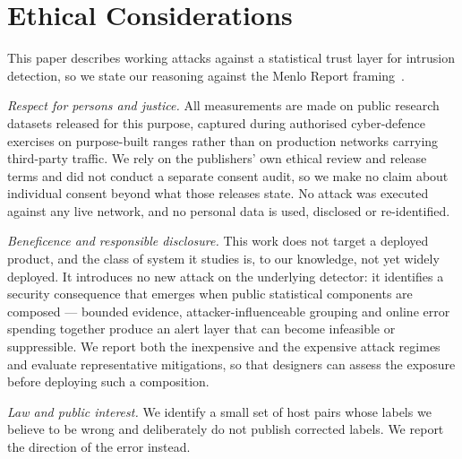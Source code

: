 \documentclass[conference]{IEEEtran}
\begin{document}
\section*{Ethical Considerations}

This paper describes working attacks against a statistical trust layer for intrusion detection, so we
state our reasoning against the Menlo Report framing~\cite{menlo2012}.

\emph{Respect for persons and justice.} All measurements are made on public research datasets released
for this purpose, captured during authorised cyber-defence exercises on purpose-built ranges rather than
on production networks carrying third-party traffic. We rely on the publishers' own ethical review and
release terms and did not conduct a separate consent audit, so we make no claim about individual consent
beyond what those releases state. No attack was executed against any live network, and no personal data
is used, disclosed or re-identified.

\emph{Beneficence and responsible disclosure.} This work does not target a deployed product, and the
class of system it studies is, to our knowledge, not yet widely deployed. It introduces no new attack on the underlying detector: it
identifies a security consequence that emerges when public statistical components are composed ---
bounded evidence, attacker-influenceable grouping and online error spending together produce an alert
layer that can become infeasible or suppressible. We report both the inexpensive and the expensive
attack regimes and evaluate representative mitigations, so that designers can assess the exposure
before deploying such a composition.

\emph{Law and public interest.} We identify a small set of host pairs whose labels we believe to be wrong
and deliberately do not publish corrected labels. We report
the direction of the error instead.




\appendices
\end{document}
